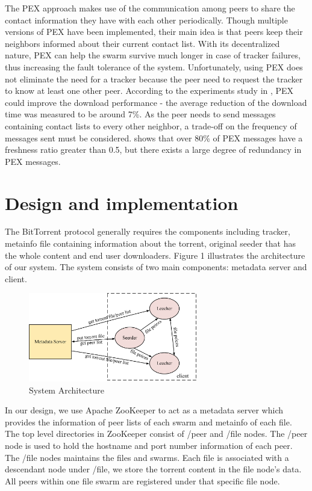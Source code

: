 \documentclass[conference]{IEEEtran}
\begin{document}
	The PEX approach makes use of the communication among peers to share the contact information they have with each other periodically. Though multiple versions of PEX have been implemented, their main idea is that peers keep their neighbors informed about their current contact list. With its decentralized nature, PEX can help the swarm survive much longer in case of tracker failures, thus increasing the fault tolerance of the system. Unfortunately, using PEX does not eliminate the need for a tracker because the peer need to request the tracker to know at least one other peer. According to the experiments study in \cite{PEX}, PEX could improve the download performance - the average reduction of the download time was measured to be around 7\%. As the peer needs to send messages containing contact lists to every other neighbor, a trade-off on the frequency of messages sent must be considered. \cite{PEX} shows that over 80\% of PEX messages have a freshness ratio greater than 0.5, but there exists a large degree of redundancy in PEX messages.
	
	
	
	
	\section{Design and implementation}
	The BitTorrent protocol generally requires the components including tracker, metainfo file containing information about the torrent, original seeder that has the whole content and end user downloaders. Figure 1 illustrates the architecture of our system. The system consists of two main components: metadata server and client. 
	
	\begin{figure}
		\centering
		\includegraphics[width=2.9in]{f3.png}
		\caption{System Architecture}
		\label{fig:side:1}
	\end{figure}
	
	In our design, we use Apache ZooKeeper to act as a metadata server which provides the information of peer lists of each swarm and metainfo of each file. The top level directories in ZooKeeper consist of /peer and /file nodes. The /peer node is used to hold the hostname and port number information of each peer. The /file nodes maintains the files and swarms.  Each file is associated with a descendant node under /file, we store the  torrent content in the file node's data. All peers within one file swarm are registered under that specific file node.
	
\end{document}
